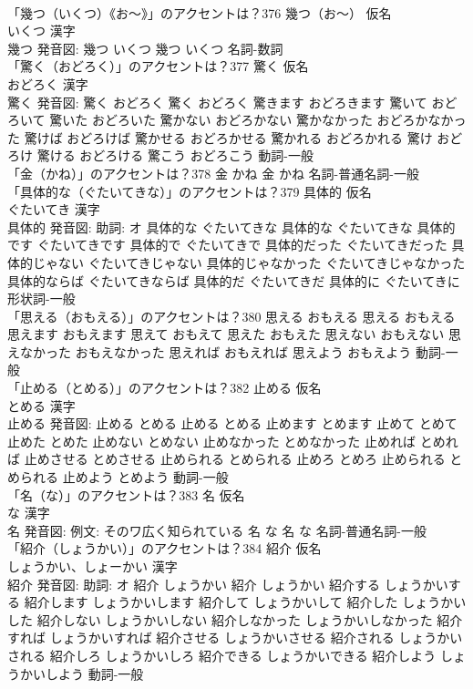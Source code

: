 \documentclass[8pt]{extreport}
\begin{document}
\begin{CJK}{UTF8}{min}
\\	「幾つ（いくつ）《お〜》」のアクセントは？376	幾つ（お〜） 仮名　
\\	いくつ 漢字　
\\	幾つ 発音図:	幾つ いくつ		幾つ いくつ				名詞-数詞 
\\	「驚く（おどろく）」のアクセントは？377	驚く 仮名　
\\	おどろく 漢字　
\\	驚く 発音図:	驚く おどろく		驚く おどろく 驚きます おどろきます 驚いて おどろいて 驚いた おどろいた 驚かない おどろかない 驚かなかった おどろかなかった 驚けば おどろけば 驚かせる おどろかせる 驚かれる おどろかれる 驚け おどろけ 驚ける おどろける 驚こう おどろこう				動詞-一般 
\\	「金（かね）」のアクセントは？378		金 かね		金 かね				名詞-普通名詞-一般 
\\	「具体的な（ぐたいてきな）」のアクセントは？379	具体的 仮名　
\\	ぐたいてき 漢字　
\\	具体的 発音図: 助詞: オ	具体的な ぐたいてきな		具体的な ぐたいてきな 具体的です ぐたいてきです 具体的で ぐたいてきで 具体的だった ぐたいてきだった 具体的じゃない ぐたいてきじゃない 具体的じゃなかった ぐたいてきじゃなかった 具体的ならば ぐたいてきならば 具体的だ ぐたいてきだ 具体的に ぐたいてきに				形状詞-一般 
\\	「思える（おもえる）」のアクセントは？380		思える おもえる		思える おもえる 思えます おもえます 思えて おもえて 思えた おもえた 思えない おもえない 思えなかった おもえなかった 思えれば おもえれば 思えよう おもえよう				動詞-一般 
\\	「止める（とめる）」のアクセントは？382	止める 仮名　
\\	とめる 漢字　
\\	止める 発音図:	止める とめる		止める とめる 止めます とめます 止めて とめて 止めた とめた 止めない とめない 止めなかった とめなかった 止めれば とめれば 止めさせる とめさせる 止められる とめられる 止めろ とめろ 止められる とめられる 止めよう とめよう				動詞-一般 
\\	「名（な）」のアクセントは？383	名 仮名　
\\	な 漢字　
\\	名 発音図: 例文: そのワ広く知られている	名 な		名 な				名詞-普通名詞-一般 
\\	「紹介（しょうかい）」のアクセントは？384	紹介 仮名　
\\	しょうかい、しょーかい 漢字　
\\	紹介 発音図: 助詞: オ	紹介 しょうかい		紹介 しょうかい 紹介する しょうかいする 紹介します しょうかいします 紹介して しょうかいして 紹介した しょうかいした 紹介しない しょうかいしない 紹介しなかった しょうかいしなかった 紹介すれば しょうかいすれば 紹介させる しょうかいさせる 紹介される しょうかいされる 紹介しろ しょうかいしろ 紹介できる しょうかいできる 紹介しよう しょうかいしよう				動詞-一般 

\end{CJK}
\end{document}
